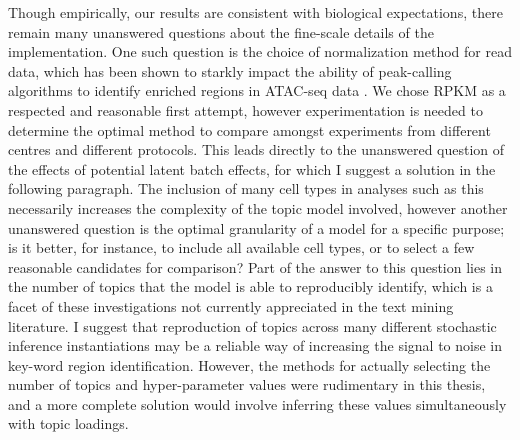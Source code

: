 Though empirically, our results are consistent with biological expectations, there remain many unanswered questions about the fine-scale details of the implementation. One such question is the choice of normalization method for read data, which has been shown to starkly impact the ability of peak-calling algorithms to identify enriched regions in ATAC-seq data \cite{Reske2020a}. We chose RPKM as a respected and reasonable first attempt, however experimentation is needed to determine the optimal method to compare amongst experiments from different centres and different protocols. This leads directly to the unanswered question of the effects of potential latent batch effects, for which I suggest a solution in the following paragraph. The inclusion of many cell types in analyses such as this necessarily increases the complexity of the topic model involved, however another unanswered question is the optimal granularity of a model for a specific purpose; is it better, for instance, to include all available cell types, or to select a few reasonable candidates for comparison? Part of the answer to this question lies in the number of topics that the model is able to reproducibly identify, which is a facet of these investigations not currently appreciated in the text mining literature. I suggest that reproduction of topics across many different stochastic inference instantiations may be a reliable way of increasing the signal to noise in key-word region identification. However, the methods for actually selecting the number of topics and hyper-parameter values were rudimentary in this thesis, and a more complete solution would involve inferring these values simultaneously with topic loadings. 

